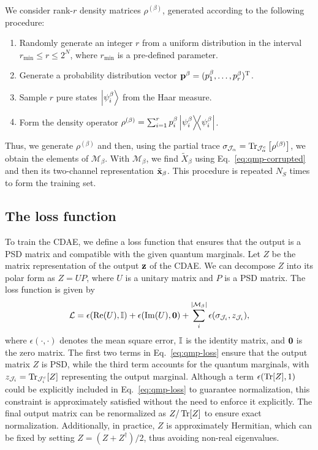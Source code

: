 We consider rank-$r$ density matrices $\rho^{(\beta)}$, generated according to the following procedure:
\begin{enumerate}[label=(\roman*)]
\item Randomly generate an integer $r$ from a uniform distribution in the interval $r_{\min} \leq r \leq 2^N$, where $r_{\min}$ is a pre-defined parameter.
\item Generate a probability distribution vector $\vb{p}^\beta = (p_1^\beta, \ldots, p_r^\beta)^{\mathrm{T}}$.
\item Sample $r$ pure states $\ket{\psi_i^\beta}$ from the Haar measure.
\item Form the density operator $\rho^{(\beta)} = \sum_{i=1}^{r} p_i^\beta \dyad{\psi_i^\beta}$.
\end{enumerate}
Thus, we generate $\rho^{(\beta)}$ and then, using the partial trace $\sigma_{\mathcal{J}_\alpha} = \Tr_{\mathcal{J}_\alpha^c}\qty[\rho^{(\beta)}]$, we obtain the elements of $\mathcal{M}_\beta$. With $\mathcal{M}_\beta$, we find $\tilde{X}_\beta$ using Eq.~\eqref{eq:qmp-corrupted} and then its two-channel representation $\tilde{\vb{x}}_\beta$. This procedure is repeated $N_S$ times to form the training set.

\subsection{The loss function}
\label{sec:qmp-loss}

To train the CDAE, we define a loss function that ensures that the output is a PSD matrix and compatible with the given quantum marginals. Let $Z$ be the matrix representation of the output $\vb{z}$ of the CDAE. We can decompose $Z$ into its polar form as $Z = UP$, where $U$ is a unitary matrix and $P$ is a PSD matrix. The loss function is given by
\begin{equation}
\label{eq:qmp-loss}
\mathcal{L} = \epsilon\qty(\Re(U), \mathbb{I}) + \epsilon\qty(\Im(U), \vb{0})
+ \sum_{i}^{\abs{\mathcal{M}_\beta}} \epsilon\qty(\sigma_{\mathcal{J}_i}, z_{\mathcal{J}_i}),
\end{equation}
where $\epsilon(\cdot, \cdot)$ denotes the mean square error, $\mathbb{I}$ is the identity matrix, and $\vb{0}$ is the zero matrix. The first two terms in Eq.~\eqref{eq:qmp-loss} ensure that the output matrix $Z$ is PSD, while the third term accounts for the quantum marginals, with $z_{\mathcal{J}_i} = \Tr_{\mathcal{J}_i^c}[Z]$ representing the output marginal. Although a term $\epsilon(\Tr[Z], 1)$ could be explicitly included in Eq.~\eqref{eq:qmp-loss} to guarantee normalization, this constraint is approximately satisfied without the need to enforce it explicitly. The final output matrix can be renormalized as $Z/\Tr[Z]$ to ensure exact normalization. Additionally, in practice, $Z$ is approximately Hermitian, which can be fixed by setting $Z = (Z + Z^\dagger)/2$, thus avoiding non-real eigenvalues.

